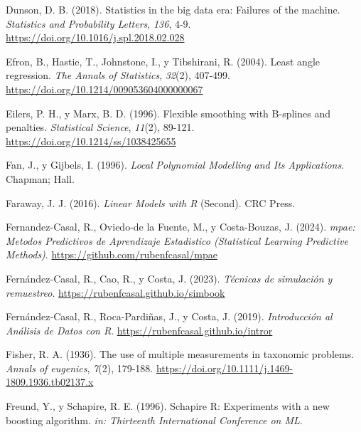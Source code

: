 \documentclass[
]{book}
\newlength{\cslhangindent}
\newlength{\cslentryspacingunit} %
\newenvironment{CSLReferences}[2] %
 {%
  \setlength{\parindent}{0pt}
  \ifodd #1
  \let\oldpar\par
  \def\par{\hangindent=\cslhangindent\oldpar}
  \fi
  \setlength{\parskip}{#2\cslentryspacingunit}
 }%
 {}
\theoremstyle{break}
\theoremstyle{nonumberplain}
\begin{document}
\begin{CSLReferences}{1}{0}
\leavevmode{}%
Dunson, D. B. (2018). Statistics in the big data era: Failures of the machine. \emph{Statistics and Probability Letters}, \emph{136}, 4-9. \url{https://doi.org/10.1016/j.spl.2018.02.028}

\leavevmode{}%
Efron, B., Hastie, T., Johnstone, I., y Tibshirani, R. (2004). Least angle regression. \emph{The Annals of Statistics}, \emph{32}(2), 407-499. \url{https://doi.org/10.1214/009053604000000067}

\leavevmode{}%
Eilers, P. H., y Marx, B. D. (1996). Flexible smoothing with B-splines and penalties. \emph{Statistical Science}, \emph{11}(2), 89-121. \url{https://doi.org/10.1214/ss/1038425655}

\leavevmode{}%
Fan, J., y Gijbels, I. (1996). \emph{Local Polynomial Modelling and Its Applications}. Chapman; Hall.

\leavevmode{}%
Faraway, J. J. (2016). \emph{Linear Models with R} (Second). CRC Press.

\leavevmode{}%
Fernandez-Casal, R., Oviedo-de la Fuente, M., y Costa-Bouzas, J. (2024). \emph{mpae: Metodos Predictivos de Aprendizaje Estadistico (Statistical Learning Predictive Methods)}. \url{https://github.com/rubenfcasal/mpae}

\leavevmode{}%
Fernández-Casal, R., Cao, R., y Costa, J. (2023). \emph{Técnicas de simulación y remuestreo}. \url{https://rubenfcasal.github.io/simbook}

\leavevmode{}%
Fernández-Casal, R., Roca-Pardiñas, J., y Costa, J. (2019). \emph{Introducción al Análisis de Datos con R}. \url{https://rubenfcasal.github.io/intror}

\leavevmode{}%
Fisher, R. A. (1936). The use of multiple measurements in taxonomic problems. \emph{Annals of eugenics}, \emph{7}(2), 179-188. \url{https://doi.org/10.1111/j.1469-1809.1936.tb02137.x}

\leavevmode{}%
Freund, Y., y Schapire, R. E. (1996). Schapire R: Experiments with a new boosting algorithm. \emph{in: Thirteenth International Conference on ML}.


\end{CSLReferences}
\end{document}
